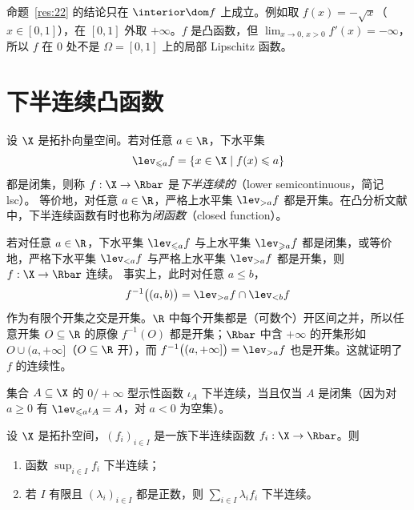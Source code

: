 \begin{remark}
\label{rem:6}
命题~\ref{res:22} 的结论只在 $\interior\dom f$ 上成立。例如取
$f(x)=-\sqrt{x}$（$x\in[0,1]$），在 $[0,1]$ 外取 $+\infty$。$f$ 是凸函数，但 $\lim_{x\to0,\,x>0}f'(x)=-\infty$，所以 $f$ 在 $0$ 处不是 $\Omega=[0,1]$ 上的局部 Lipschitz 函数。
\end{remark}

\section{下半连续凸函数}

\begin{definition}[下半连续]
\label{def:15}
设 $\X$ 是拓扑向量空间。若对任意 $a\in\R$，下水平集
\[
  \lev_{\leqslant a}f=\{x\in\X \mid f(x)\leqslant a\}
\]
都是闭集，则称 $f:\X\to\Rbar$ 是\emph{下半连续的}（lower semicontinuous，简记 lsc）。
等价地，对任意 $a\in\R$，严格上水平集 $\lev_{>a}f$ 都是开集。在凸分析文献中，下半连续函数有时也称为\emph{闭函数}（closed function）。
\end{definition}

\begin{remark}[与连续性的关系]
\label{rem:7}
若对任意 $a\in\R$，下水平集 $\lev_{\leqslant a}f$ 与上水平集 $\lev_{\geqslant a}f$ 都是闭集，或等价地，严格下水平集 $\lev_{<a}f$ 与严格上水平集 $\lev_{>a}f$ 都是开集，则 $f:\X\to\Rbar$ 连续。
事实上，此时对任意 $a\leqslant b$，
\[
  f^{-1}\bigl((a,b)\bigr)=\lev_{>a}f\cap\lev_{<b}f
\]
作为有限个开集之交是开集。$\R$ 中每个开集都是（可数个）开区间之并，所以任意开集 $O\subseteq\R$ 的原像 $f^{-1}(O)$ 都是开集；$\Rbar$ 中含 $+\infty$ 的开集形如 $O\cup(a,+\infty]$（$O\subseteq\R$ 开），而 $f^{-1}\bigl((a,+\infty]\bigr)=\lev_{>a}f$ 也是开集。这就证明了 $f$ 的连续性。
\end{remark}

\begin{example}[示性函数]
\label{exa:7}
集合 $A\subseteq\X$ 的 $0/+\infty$ 型示性函数 $\iota_A$ 下半连续，当且仅当 $A$ 是闭集（因为对 $a\geqslant0$ 有 $\lev_{\leqslant a}\iota_A=A$，对 $a<0$ 为空集）。
\end{example}

\begin{proposition}
\label{res:23}
设 $\X$ 是拓扑空间，$(f_i)_{i\in I}$ 是一族下半连续函数 $f_i:\X\to\Rbar$。则
\begin{enumerate}[label=(\roman*)]
  \item 函数 $\sup_{i\in I}f_i$ 下半连续；
  \item 若 $I$ 有限且 $(\lambda_i)_{i\in I}$ 都是正数，则 $\sum_{i\in I}\lambda_if_i$ 下半连续。
\end{enumerate}
\end{proposition}


